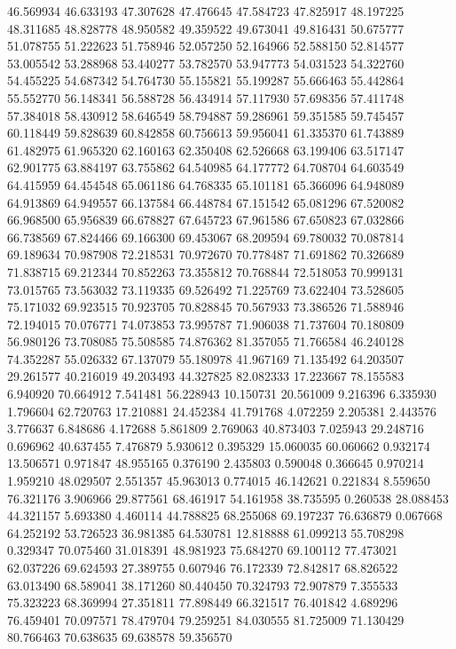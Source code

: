 46.569934
46.633193
47.307628
47.476645
47.584723
47.825917
48.197225
48.311685
48.828778
48.950582
49.359522
49.673041
49.816431
50.675777
51.078755
51.222623
51.758946
52.057250
52.164966
52.588150
52.814577
53.005542
53.288968
53.440277
53.782570
53.947773
54.031523
54.322760
54.455225
54.687342
54.764730
55.155821
55.199287
55.666463
55.442864
55.552770
56.148341
56.588728
56.434914
57.117930
57.698356
57.411748
57.384018
58.430912
58.646549
58.794887
59.286961
59.351585
59.745457
60.118449
59.828639
60.842858
60.756613
59.956041
61.335370
61.743889
61.482975
61.965320
62.160163
62.350408
62.526668
63.199406
63.517147
62.901775
63.884197
63.755862
64.540985
64.177772
64.708704
64.603549
64.415959
64.454548
65.061186
64.768335
65.101181
65.366096
64.948089
64.913869
64.949557
66.137584
66.448784
67.151542
65.081296
67.520082
66.968500
65.956839
66.678827
67.645723
67.961586
67.650823
67.032866
66.738569
67.824466
69.166300
69.453067
68.209594
69.780032
70.087814
69.189634
70.987908
72.218531
70.972670
70.778487
71.691862
70.326689
71.838715
69.212344
70.852263
73.355812
70.768844
72.518053
70.999131
73.015765
73.563032
73.119335
69.526492
71.225769
73.622404
73.528605
75.171032
69.923515
70.923705
70.828845
70.567933
73.386526
71.588946
72.194015
70.076771
74.073853
73.995787
71.906038
71.737604
70.180809
56.980126
73.708085
75.508585
74.876362
81.357055
71.766584
46.240128
74.352287
55.026332
67.137079
55.180978
41.967169
71.135492
64.203507
29.261577
40.216019
49.203493
44.327825
82.082333
17.223667
78.155583
6.940920
70.664912
7.541481
56.228943
10.150731
20.561009
9.216396
6.335930
1.796604
62.720763
17.210881
24.452384
41.791768
4.072259
2.205381
2.443576
3.776637
6.848686
4.172688
5.861809
2.769063
40.873403
7.025943
29.248716
0.696962
40.637455
7.476879
5.930612
0.395329
15.060035
60.060662
0.932174
13.506571
0.971847
48.955165
0.376190
2.435803
0.590048
0.366645
0.970214
1.959210
48.029507
2.551357
45.963013
0.774015
46.142621
0.221834
8.559650
76.321176
3.906966
29.877561
68.461917
54.161958
38.735595
0.260538
28.088453
44.321157
5.693380
4.460114
44.788825
68.255068
69.197237
76.636879
0.067668
64.252192
53.726523
36.981385
64.530781
12.818888
61.099213
55.708298
0.329347
70.075460
31.018391
48.981923
75.684270
69.100112
77.473021
62.037226
69.624593
27.389755
0.607946
76.172339
72.842817
68.826522
63.013490
68.589041
38.171260
80.440450
70.324793
72.907879
7.355533
75.323223
68.369994
27.351811
77.898449
66.321517
76.401842
4.689296
76.459401
70.097571
78.479704
79.259251
84.030555
81.725009
71.130429
80.766463
70.638635
69.638578
59.356570
